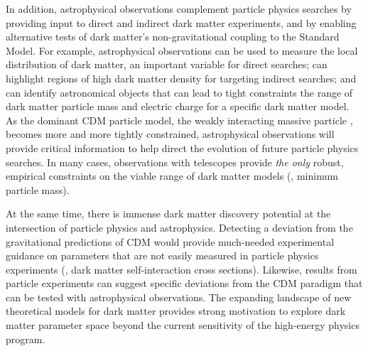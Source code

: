 In addition, astrophysical observations complement particle physics searches by providing input to direct and indirect dark matter experiments, and by enabling alternative tests of dark matter's non-gravitational coupling to the Standard Model.  
For example, astrophysical observations can be used to measure the local distribution of dark matter, an important variable for direct searches; can highlight regions of high dark matter density for targeting indirect searches; and can identify astronomical objects that can lead to tight constraints the range of dark matter particle mass and electric charge for a specific dark matter model.  
As the dominant CDM particle model, the weakly interacting massive particle \citep[WIMP;][]{steigman1985}, becomes more and more tightly constrained, astrophysical observations will provide critical information to help direct the evolution of future particle physics searches.  
In many cases, observations with telescopes provide \emph{the only} robust, empirical constraints on the viable range of dark matter models (\eg, minimum particle mass).

At the same time, there is immense dark matter discovery potential at the intersection of particle physics and astrophysics.
Detecting a deviation from the gravitational predictions of CDM would provide much-needed experimental guidance on parameters that are not easily measured in particle physics experiments (\eg, dark matter self-interaction cross sections). 
Likewise, results from particle experiments can suggest specific deviations from the CDM paradigm that can be tested with astrophysical observations.
The expanding landscape of new theoretical models for dark matter provides strong motivation to explore dark matter parameter space beyond the current sensitivity of the high-energy physics program.

